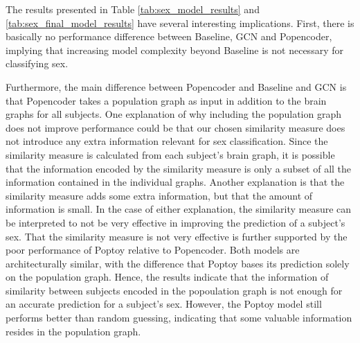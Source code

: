 The results presented in Table \ref{tab:sex_model_results} and \ref{tab:sex_final_model_results} have several interesting implications. First, there is basically no performance difference between Baseline, GCN and Popencoder, implying that increasing model complexity beyond Baseline is not necessary for classifying sex. 

Furthermore, the main difference between Popencoder and Baseline and GCN is that Popencoder takes a population graph as input in addition to the brain graphs for all subjects. One explanation of why including the population graph does not improve performance could be that our chosen similarity measure does not introduce any extra information relevant for sex classification. Since the similarity measure is calculated from each subject's brain graph, it is possible that the information encoded by the similarity measure is only a subset of all the information contained in the individual graphs. Another explanation is that the similarity measure adds some extra information, but that the amount of information is small. In the case of either explanation, the similarity measure can be interpreted to not be very effective in improving the prediction of a subject's sex. That the similarity measure is not very effective is further supported by the poor performance of Poptoy relative to Popencoder. Both models are architecturally similar, with the difference that Poptoy bases its prediction solely on the population graph. Hence, the results indicate that the information of similarity between subjects encoded in the popoulation graph is not enough for an accurate prediction for a subject's sex. However, the Poptoy model still performs better than random guessing, indicating that some valuable information resides in the population graph. 



